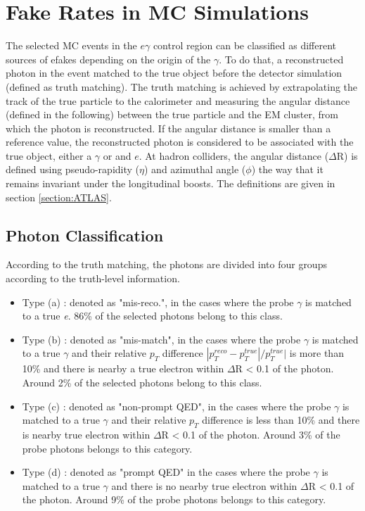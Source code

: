 \section{Fake Rates in MC Simulations}
\label{mcfc}

The selected MC events in the $e\gamma$ control region can be classified as different sources of efakes depending on the origin of the $\gamma$. To do that, a reconstructed photon in the event matched to the true object before the detector simulation (defined as truth matching). The truth matching is achieved by extrapolating the track of the true particle to the calorimeter and measuring the angular distance (defined in the following) between the true particle and the EM cluster, from which the photon is reconstructed. If the angular distance is smaller than a reference value, the reconstructed photon is considered to be associated with the true object, either a $\gamma$ or and $e$. At hadron colliders, the angular distance ($\Delta$R) is defined using pseudo-rapidity ($\eta$) and azimuthal angle ($\phi$) the way that it remains invariant under the longitudinal boosts. The definitions are given in section \ref{section:ATLAS}.

\subsection{Photon Classification}

According to the truth matching, the photons are divided into four groups according to the truth-level information.

\begin{itemize}
\item Type (a) : denoted as "mis-reco.", in the cases where the probe $\gamma$ is matched to a true \textit{e}. 86\% of the selected photons belong to this class.
\item Type (b) : denoted as "mis-match", in the cases where the probe $\gamma$ is matched to a true $\gamma$ and their relative $p_{T}$ difference $|p_{T}^{reco} - p_{T}^{true}|/p_{T}^{true}|$ is more than 10\% and there is nearby a true electron within $\Delta$R < 0.1 of the photon. Around 2\% of the selected photons belong to this class.
\item Type (c) : denoted as "non-prompt QED", in the cases where the probe $\gamma$ is matched to a true $\gamma$ and their relative $p_{T}$ difference is less than 10\% and there is nearby true electron within $\Delta$R < 0.1 of the photon. Around 3\% of the probe photons belongs to this category.
\item Type (d) : denoted as "prompt QED" in the cases where the probe $\gamma$ is matched to a true $\gamma$ and there is no nearby true electron within $\Delta$R < 0.1 of the photon. Around 9\% of the probe photons belongs to this category.
\end{itemize}

